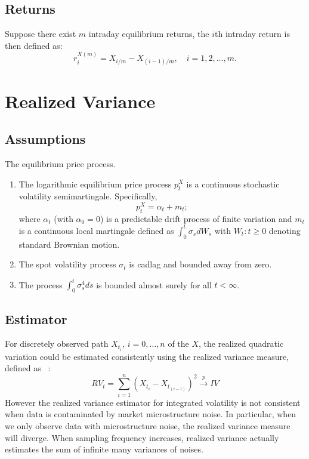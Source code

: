 \documentclass[letterpaper]{report}
\begin{document}
\subsection{Returns}
Suppose there exist $m$ intraday equilibrium returns, the $i$th intraday return is
then defined as:
\begin{equation}
r_i^{X(m)}= X_{i/m} - X_{(i-1)/m}, \quad i = 1,2,\ldots,m.
\end{equation}



\section{Realized Variance}
\subsection{Assumptions}
The equilibrium price process.
\begin{enumerate}
\item The logarithmic equilibrium price process $p_t^X$
is a continuous stochastic volatility semimartingale. Specifically,
\begin{equation}
p_t^X = \alpha_t + m_t;
\end{equation}
where $\alpha_t$ (with $\alpha_0 =0$) is a predictable drift process of
finite variation and $m_t$ is a continuous local martingale defined as
$\int_0^t\sigma_s dW_s$ with ${W_t: t\geq 0}$ denoting standard Brownian motion.
\item The spot volatility process $\sigma_t$ is cadlag and bounded away from
zero.
\item The process $\int_0^t\sigma_s^4ds$ is bounded almost surely for all $t <
\infty$.
\end{enumerate}
\subsection{Estimator}
For discretely observed path $X_{t_i}$, $i = 0,\ldots, n$ of the $X$, the
realized quadratic variation could be estimated consistently using the realized
variance measure, defined as ~\cite[Zu and Boswijk, 2014]{Zu_Boswijk}:
\begin{equation}
RV_t=\sum_{i=1}^n (X_{t_i}-X_{t_{(i-1)}})^2 \stackrel{p}{\to} IV
\end{equation}
However the realized variance estimator for integrated volatility is not consistent when data is
contaminated by market microstructure noise. In particular, when we only observe
data with microstructure noise, the realized variance measure will
diverge. When sampling frequency increases, realized variance actually estimates
the sum of infinite many variances of noises.
\end{document}
